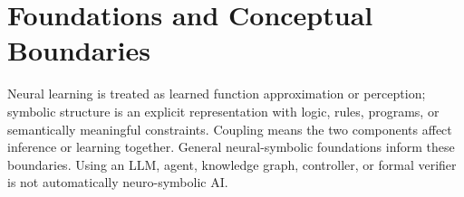 \section{Foundations and Conceptual Boundaries}

Neural learning is treated as learned function approximation or perception;
symbolic structure is an explicit representation with logic, rules, programs,
or semantically meaningful constraints. Coupling means the two components
affect inference or learning together. General neural-symbolic foundations
\cite{p_2012_05876,p_1805_10872} inform these boundaries. Using an LLM, agent,
knowledge graph, controller, or formal verifier is not automatically
neuro-symbolic AI.

